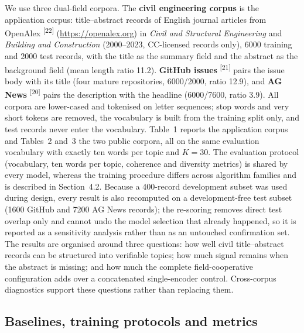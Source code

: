 \documentclass{article}
\begin{document}
We use three dual-field corpora. The \textbf{civil engineering corpus} is the application corpus:
title--abstract records of English journal articles from OpenAlex \textsuperscript{[22]} (\url{https://openalex.org}) in \emph{Civil and Structural
Engineering} and \emph{Building and Construction} (2000--2023, CC-licensed records only), 6000
training and 2000 test records, with the title as the summary field and the abstract as the
background field (mean length ratio 11.2). \textbf{GitHub issues} \textsuperscript{[21]} pairs the
issue body with its title (four mature repositories, 6000/2000, ratio 12.9), and \textbf{AG News}
\textsuperscript{[20]} pairs the description
with the headline (6000/7600, ratio 3.9). All corpora are lower-cased and tokenised on letter
sequences; stop words and very short tokens are removed, the vocabulary is built from the training
split only, and test records never enter the vocabulary. Table~1 reports the
application corpus and Tables~2 and~3 the two public corpora, all on
the same evaluation vocabulary with exactly ten words per topic and $K=30$. The evaluation
protocol (vocabulary, ten words per topic, coherence and
diversity metrics) is shared by every model, whereas the training procedure differs across
algorithm families and is described in Section~4.2. Because a 400-record
development subset was used during design, every result is also
recomputed on a development-free test subset (1600 GitHub and 7200 AG News records); the
re-scoring removes direct test overlap only and cannot undo the model selection that already
happened, so it is reported as a sensitivity analysis rather than as an untouched confirmation
set. The results are organised around three questions: how well civil title--abstract records can
be structured into verifiable topics; how much signal remains when the abstract is missing; and
how much the complete field-cooperative configuration adds over a concatenated single-encoder
control. Cross-corpus diagnostics support these questions rather than replacing them.

\subsection{Baselines, training protocols and metrics}
\label{sec:protocol}
\end{document}
